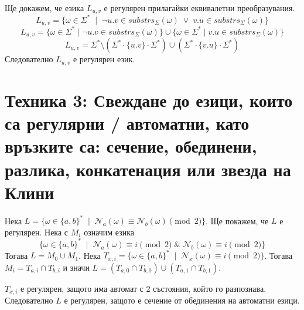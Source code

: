 \documentclass[12pt]{article}
\begin{document}
Ще докажем, че езика \(L_{u, v}\) е регулярен прилагайки еквивалетни преобразувания.
\[L_{u,v} = \{\omega \in \Sigma^* \;\mid\; \lnot u.v \in substrs_\Sigma(\omega)  \;\lor\; v.u \in substrs_\Sigma(\omega)\}\]
\[L_{u,v} = \{\omega \in \Sigma^* \mid \lnot u.v \in substrs_\Sigma(\omega) \}  \cup \{\omega \in \Sigma^* \mid v.u \in substrs_\Sigma(\omega)\}\]
\[L_{u,v} = \Sigma^* \setminus (\Sigma^* \cdot \{u.v\} \cdot \Sigma^*)  \cup (\Sigma^* \cdot \{v.u\} \cdot \Sigma^*)\]
Следователно \(L_{u,v}\) е регулярен език.

\section*{Техника 3: Свеждане до езици, които са регулярни / автоматни, като връзките са: сечение, обединени, разлика, конкатенация или звезда на Клини}
Нека \(L = \{\omega \in \{a, b\}^* \;\mid\; \mathcal{N}_a(\omega) \equiv \mathcal{N}_b(\omega) \pmod{2}\}\).
Ще покажем, че \(L\) е регулярен.
Нека с \(M_{i}\) означим езика
\[\{\omega \in \{a, b\}^* \;\mid\; \mathcal{N}_{a}(\omega) \equiv i \pmod{2} \;\&\; \mathcal{N}_b(\omega) \equiv i \pmod{2}\}\]
Тогава \(L = M_0 \cup M_1\).
Нека \(T_{x, i} = \{\omega \in \{a, b\}^* \;\mid\; \mathcal{N}_x(\omega) \equiv i \pmod{2}\}\).
Тогава \(M_i = T_{a, i} \cap T_{b, i}\) и значи \(L = (T_{a, 0} \cap T_{b, 0}) \cup (T_{a, 1} \cap T_{b, 1})\).

\vspace*{5mm}

\par \(T_{x, i}\) е регулярен, защото има автомат с 2 състояния, който го разпознава.
Следователно \(L\) е регулярен, защото е сечение от обединения на автоматни езици.
\end{document}
